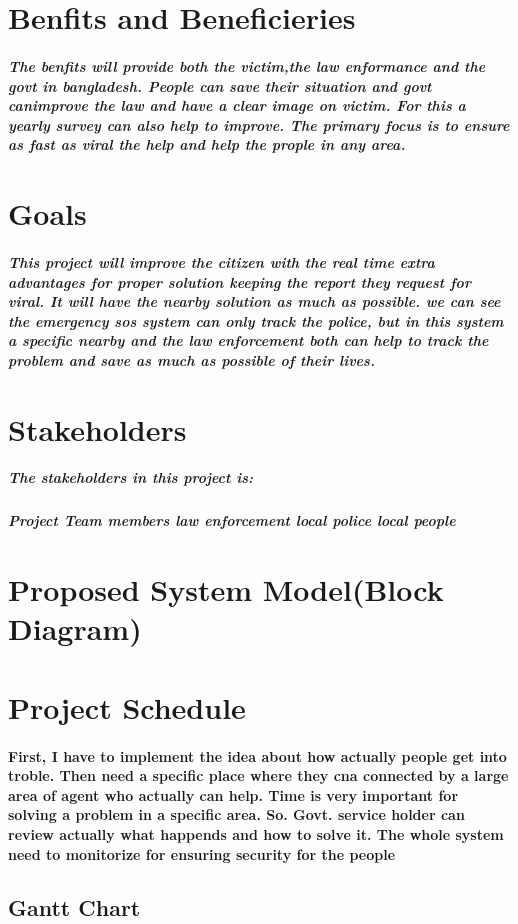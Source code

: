 \documentclass{article}
\begin{document}
\section{Benfits and Beneficieries}
\subparagraph{The benfits will provide both the victim,the law enformance and the govt in bangladesh. People can save their situation and govt canimprove the law and have a clear image on victim. For this a yearly survey can also help to improve. The primary focus is to ensure as fast as viral the help and help the prople in any area.}

\section{Goals}
\subparagraph{This project will improve the citizen with the real time extra advantages for proper solution keeping the report they request for viral. It will have the 
nearby solution as much as possible. we can see the emergency sos system can only track the police, but in this system a specific nearby and the law enforcement both can help to track the problem and save as much as possible of their lives.}


\newpage
\section{Stakeholders}
\subparagraph{The stakeholders in this project is:}
\subparagraph{Project Team members law enforcement local police local people}

\newpage
\section{Proposed System Model(Block Diagram)}
\section{Project Schedule}
\paragraph{First, I have to implement the idea about how actually people get into troble. Then need a specific place where they cna connected by a large area of agent who actually can help. Time is very important for solving a problem in a specific area. So. Govt. service holder can review actually what happends and how to solve it. The whole system need to monitorize for ensuring security for  the people}

\subsection{Gantt Chart}
\end{document}
